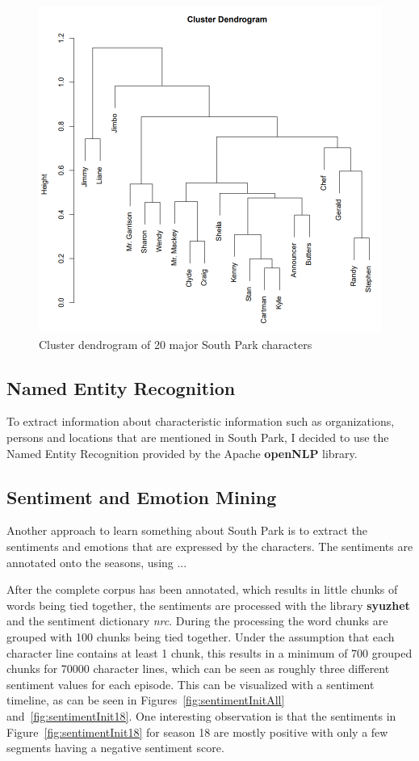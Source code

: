 \documentclass[10pt,a4paper]{article}
\begin{document}
		\begin{figure}[h]
	\centering
	\includegraphics[scale=0.4]{images/Dendrogram.png}
	\caption{Cluster dendrogram of 20 major South Park characters}
	\label{fig:Dendrogram}
	\end{figure}
	\FloatBarrier
	\newpage
	
	\subsection{Named Entity Recognition}
	To extract information about characteristic information such as organizations, persons and locations that are mentioned in South Park, I decided to use the Named Entity Recognition provided by the Apache \textbf{openNLP} library.
	
	\subsection{Sentiment and Emotion Mining}
	Another approach to learn something about South Park is to extract the sentiments and emotions that are expressed by the characters. The sentiments are annotated onto the seasons, using ...
	
	After the complete corpus has been annotated, which results in little chunks of words being tied together, the sentiments are processed with the library \textbf{syuzhet} and the sentiment dictionary \textit{nrc}.
	During the processing the word chunks are grouped with 100 chunks being tied together. Under the assumption that each character line contains at least 1 chunk, this results in a minimum of 700 grouped chunks for 70000 character lines, which can be seen as roughly three different sentiment values for each episode. This can be visualized with a sentiment timeline, as can be seen in Figures~\ref{fig:sentimentInitAll} and~\ref{fig:sentimentInit18}. One interesting observation is that the sentiments in Figure~\ref{fig:sentimentInit18} for season 18 are mostly positive with only a few segments having a negative sentiment score.
		
\end{document}
